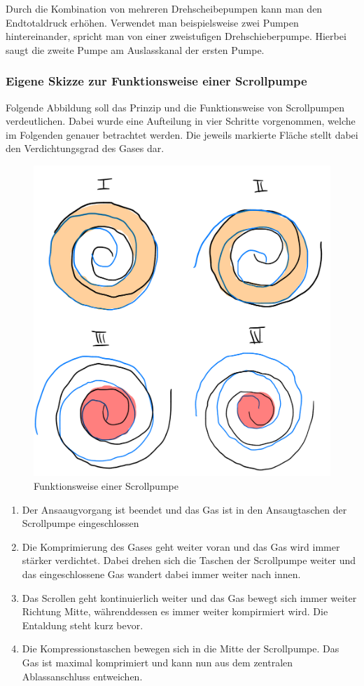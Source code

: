 \documentclass{article}
\begin{document}
Durch die Kombination von mehreren Drehscheibepumpen kann man den Endtotaldruck erhöhen. Verwendet man beispielsweise zwei Pumpen hintereinander, spricht man von einer zweistufigen Drehschieberpumpe. Hierbei saugt die zweite Pumpe am Auslasskanal der ersten Pumpe.

\subsubsection{Eigene Skizze zur Funktionsweise einer Scrollpumpe}

\cite{vt}

Folgende Abbildung soll das Prinzip und die Funktionsweise von Scrollpumpen verdeutlichen. Dabei wurde eine Aufteilung in vier Schritte vorgenommen, welche im Folgenden genauer betrachtet werden. Die jeweils markierte Fläche stellt dabei den Verdichtungsgrad des Gases dar.

\begin{figure}[H]
    \centering
    \includegraphics[width=0.5\linewidth]{Abbildungen/Scrollpumpe.jpeg}
    \caption{Funktionsweise einer Scrollpumpe}
\end{figure}

\begin{enumerate}[label = \Roman*.]
    \item Der Ansaaugvorgang ist beendet und das Gas ist in den Ansaugtaschen der Scrollpumpe eingeschlossen
    \item Die Komprimierung des Gases geht weiter voran und das Gas wird immer stärker verdichtet. Dabei drehen sich die Taschen der Scrollpumpe weiter und das eingeschlossene Gas wandert dabei immer weiter nach innen.
    \item Das Scrollen geht kontinuierlich weiter und das Gas bewegt sich immer weiter Richtung Mitte, währenddessen es immer weiter kompirmiert wird. Die Entaldung steht kurz bevor.
    \item Die Kompressionstaschen bewegen sich in die Mitte der Scrollpumpe. Das Gas ist maximal komprimiert und kann nun aus dem zentralen Ablassanschluss entweichen.
\end{enumerate}
\end{document}

